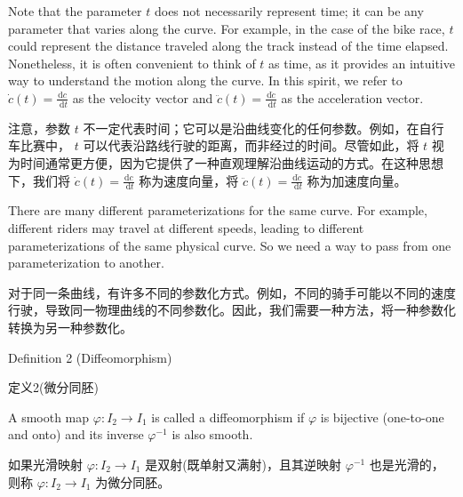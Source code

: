Note that the parameter \(t\) does not necessarily represent time; it can be any parameter that varies along the curve. For example, in the case of the bike race, \(t\) could represent the distance traveled along the track instead of the time elapsed. Nonetheless, it is often convenient to think of \(t\) as time, as it provides an intuitive way to understand the motion along the curve. In this spirit, we refer to \(\dot{c}\left( t\right)  = \frac{\mathrm{d}c}{\mathrm{\;d}t}\) as the velocity vector and \(\ddot{c}\left( t\right)  = \frac{\mathrm{d}\dot{c}}{\mathrm{\;d}t}\) as the acceleration vector.

\begin{tcolorbox}
注意，参数 \(t\) 不一定代表时间；它可以是沿曲线变化的任何参数。例如，在自行车比赛中， \(t\) 可以代表沿路线行驶的距离，而非经过的时间。尽管如此，将 \(t\) 视为时间通常更方便，因为它提供了一种直观理解沿曲线运动的方式。在这种思想下，我们将 \(\dot{c}\left( t\right)  = \frac{\mathrm{d}c}{\mathrm{\;d}t}\) 称为速度向量，将 \(\ddot{c}\left( t\right)  = \frac{\mathrm{d}\dot{c}}{\mathrm{\;d}t}\) 称为加速度向量。
\end{tcolorbox}

There are many different parameterizations for the same curve. For example, different riders may travel at different speeds, leading to different parameterizations of the same physical curve. So we need a way to pass from one parameterization to another.

\begin{tcolorbox}
对于同一条曲线，有许多不同的参数化方式。例如，不同的骑手可能以不同的速度行驶，导致同一物理曲线的不同参数化。因此，我们需要一种方法，将一种参数化转换为另一种参数化。
\end{tcolorbox}

\HRule

Definition 2 (Diffeomorphism)

\begin{tcolorbox}
定义2(微分同胚)
\end{tcolorbox}

\HRule

A smooth map \(\varphi  : {I}_{2} \rightarrow  {I}_{1}\) is called a diffeomorphism if \(\varphi\) is bijective (one-to-one and onto) and its inverse \({\varphi }^{-1}\) is also smooth.

\begin{tcolorbox}
如果光滑映射 \(\varphi  : {I}_{2} \rightarrow  {I}_{1}\) 是双射(既单射又满射)，且其逆映射 \({\varphi }^{-1}\) 也是光滑的，则称 \(\varphi  : {I}_{2} \rightarrow  {I}_{1}\) 为微分同胚。
\end{tcolorbox}

